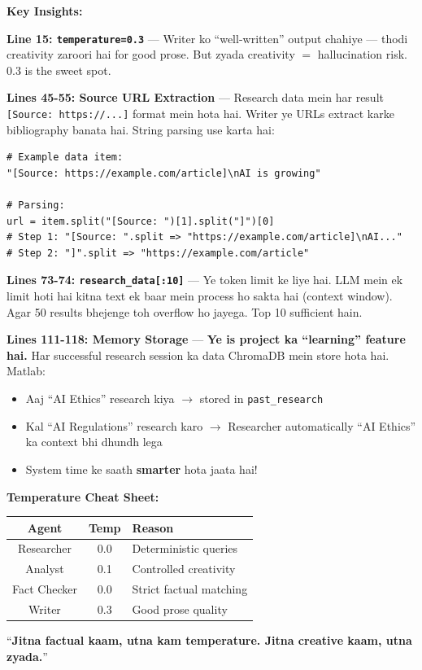 \documentclass[12pt, a4paper]{article}
\begin{document}
\begin{codestorybox}
\textbf{Key Insights:}

\textbf{Line 15: \texttt{temperature=0.3}} --- Writer ko ``well-written'' output chahiye --- thodi creativity zaroori hai for good prose. But zyada creativity $=$ hallucination risk. 0.3 is the sweet spot.

\textbf{Lines 45-55: Source URL Extraction} --- Research data mein har result \texttt{[Source: https://...]} format mein hota hai. Writer ye URLs extract karke bibliography banata hai. String parsing use karta hai:
\begin{lstlisting}[style=pythonstyle]
# Example data item:
"[Source: https://example.com/article]\nAI is growing"

# Parsing:
url = item.split("[Source: ")[1].split("]")[0]
# Step 1: "[Source: ".split => "https://example.com/article]\nAI..."
# Step 2: "]".split => "https://example.com/article"
\end{lstlisting}

\textbf{Lines 73-74: \texttt{research\_data[:10]}} --- Ye token limit ke liye hai. LLM mein ek limit hoti hai kitna text ek baar mein process ho sakta hai (context window). Agar 50 results bhejenge toh overflow ho jayega. Top 10 sufficient hain.

\textbf{Lines 111-118: Memory Storage} --- \textbf{Ye is project ka ``learning'' feature hai.} Har successful research session ka data ChromaDB mein store hota hai. Matlab:
\begin{itemize}
\item Aaj ``AI Ethics'' research kiya $\rightarrow$ stored in \texttt{past\_research}
\item Kal ``AI Regulations'' research karo $\rightarrow$ Researcher automatically ``AI Ethics'' ka context bhi dhundh lega
\item System time ke saath \textbf{smarter} hota jaata hai!
\end{itemize}
\end{codestorybox}

\begin{memorybox}
\textbf{Temperature Cheat Sheet:}
\begin{center}
\begin{tabular}{|c|c|l|}
\hline
\rowcolor{accentpurple!15}
\textbf{Agent} & \textbf{Temp} & \textbf{Reason} \\
\hline
Researcher & 0.0 & Deterministic queries \\
Analyst & 0.1 & Controlled creativity \\
Fact Checker & 0.0 & Strict factual matching \\
Writer & 0.3 & Good prose quality \\
\hline
\end{tabular}
\end{center}
``\textbf{Jitna factual kaam, utna kam temperature. Jitna creative kaam, utna zyada.}''
\end{memorybox}
\end{document}
